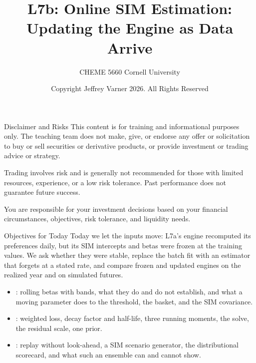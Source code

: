\documentclass[aspectratio=169,11pt]{beamer}
\title{\texorpdfstring{{\vnheavy L7b}}{L7b}: Online SIM Estimation: Updating the Engine as Data Arrive}
\subtitle{CHEME 5660 Cornell University}
\author{Copyright Jeffrey Varner 2026. All Rights Reserved}
\begin{document}
\vntitlepage

\begin{frame}{Disclaimer and Risks}
  \vspace{0.6em}
  \textbf{} This content is for training and informational
  purposes only. The teaching team does not make, give, or endorse any offer or
  solicitation to buy or sell securities or derivative products, or provide
  investment or trading advice or strategy.

  \vspace{1.1em}
  \textbf{} Trading involves risk and is generally not recommended for
  those with limited resources, experience, or a low risk tolerance. Past
  performance does not guarantee future success.

  \vspace{1.1em}
  \textbf{} You are responsible for your investment decisions
  based on your financial circumstances, objectives, risk tolerance, and
  liquidity needs.
\end{frame}

\begin{frame}{Objectives for Today}
  Today we let the inputs move: L7a's engine recomputed its preferences daily,
  but its SIM intercepts and betas were frozen at the training values. We ask
  whether they were stable, replace the batch fit with an estimator that forgets
  at a stated rate, and compare frozen and updated engines on the realized year
  and on simulated futures.

  \vspace{0.5em}
  {\large\textbf{}}
  \vspace{0.2em}
  \begin{itemize}\setlength{\itemsep}{0.4em}
    \item {}: rolling betas with bands, what
      they do and do not establish, and what a moving parameter does to the
      threshold, the basket, and the SIM covariance.
    \item {}: weighted loss, decay factor and half-life,
      three running moments, the solve, the residual scale, one prior.
    \item {}: replay without look-ahead, a SIM
      scenario generator, the distributional scorecard, and what such an ensemble
      can and cannot show.
  \end{itemize}
\end{frame}
\end{document}
